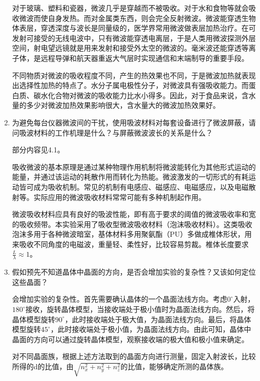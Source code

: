 \documentclass[11pt]{article}
\begin{document}
\begin{enumerate}
    \par \hspace*{2em} 对于玻璃、塑料和瓷器，微波几乎是穿越而不被吸收。对于水和食物等就会吸收微波而使自身发热。而对金属类东西，则会完全反射微波。微波能穿透生物体表层，穿透深度与波长是同量级的，医学界常用微波做表层加热治疗。在可发射可接受的无线电波中，只有微波能穿透电离层，于是人类用微波探测外层空间，射电望远镜就是用来发射和接受外太空的微波的。毫米波还能穿透等离子体，是远程导弹和航天器重返大气层时实现通信和末端制导的重要手段。
    \par \hspace*{2em} 不同物质对微波的吸收程度不同，产生的热效果也不同，于是微波加热就表现出选择性加热的特点了。水分子属电极性分子，对微波具有强吸收能力。而蛋白质、碳水化合物对微波的吸收能力比水小得多。因此，对于食品来说，含水量的多少对微波加热效果影响很大，含水量大的微波加热效果好。
    \item 为避免每台仪器微波间的干扰，使用吸波材料对每套设备进行了微波屏蔽，请问吸波材料的工作机理是什么？与屏蔽微波波长的关系是什么？
    \par \hspace*{2em} 部分内容见4.1。
    \par \hspace*{2em} 吸收微波的基本原理是通过某种物理作用机制将微波能转化为其他形式运动的能量，并通过该运动的耗散作用而转化为热能。微波激发的一切形式的有耗运动皆可成为吸收机制。常见的机制有电感应、磁感应、电磁感应，以及电磁散射等。实际应用的微波吸收材料常常可能有多种机制起作用。
    \par \hspace*{2em} 微波吸收材料应具有良好的吸波性能，即有高于要求的阈值的微波吸收率和宽的吸收频带。本实验采用了吸收型微波吸收材料（泡沫吸收材料）。这类吸收泡沫多用于各种微波暗室，基体材料多用聚氨酯（PU）多做成椎体形状，用来吸收不同角度的电磁波，重量轻、柔性好，比较容易剪裁。椎体长度要求$\frac{L}{\lambda}\approx 1$。
    \item 假如预先不知道晶体中晶面的方向，是否会增加实验的复杂性？又该如何定位这些晶面？
    \par \hspace*{2em} 会增加实验的复杂性。首先需要确认晶体的一个晶面法线方向。考虑$0^\circ$入射，$180^\circ$接收，旋转晶体模型，当接收端处于极小值时为晶面法线方向。然后，将晶体模型旋转$90^\circ$，此时接收端处于极大值，为晶面法线方向。最后，将晶体模型旋转$45^\circ$，此时接收端处于极小值，为晶面法线方向。由此可知，晶体中晶面的方向可以通过旋转晶体模型，观察接收端的极大值和极小值来确定。
    \par \hspace*{2em} 对不同晶面族，根据上述方法取到的晶面方向进行测量，固定入射波长，比较所得的d的比值，由$\sqrt{n_x^2+n_y^2+n_z^2}$的比值，能够确定所测的晶体族。

\end{enumerate}
\end{document}
